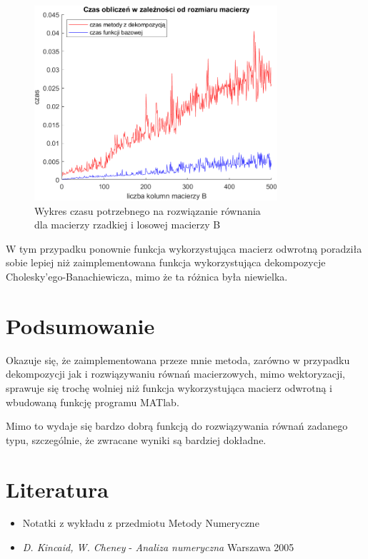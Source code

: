 \documentclass{article}
\begin{document}
\begin{figure}[htp]
\centering
  \centering
  \includegraphics[width=9cm]{wykresy/przyklad10.png}
  \caption{Wykres czasu potrzebnego na rozwiązanie równania \\
  dla macierzy rzadkiej i losowej macierzy B}
  \label{fig:sub1}
\label{fig:test}
\end{figure}

W tym przypadku ponownie funkcja wykorzystująca macierz odwrotną poradziła sobie lepiej niż zaimplementowana funkcja wykorzystująca dekompozycje Cholesky'ego-Banachiewicza, mimo że ta różnica była niewielka. 

\newpage
\section{Podsumowanie}
Okazuje się, że zaimplementowana przeze mnie metoda, zarówno w przypadku dekompozycji jak i rozwiązywaniu równań macierzowych, mimo wektoryzacji, sprawuje się trochę wolniej niż funkcja wykorzystująca macierz odwrotną i wbudowaną funkcję programu MATlab.

Mimo to wydaje się bardzo dobrą funkcją do rozwiązywania równań zadanego typu, szczególnie, że zwracane wyniki są bardziej dokładne.

\section{Literatura}
\begin{itemize}
    \item Notatki z wykładu z przedmiotu Metody Numeryczne
    \item \textit{D. Kincaid, W. Cheney} - \textit{Analiza numeryczna} Warszawa 2005
\end{itemize}
\end{document}
